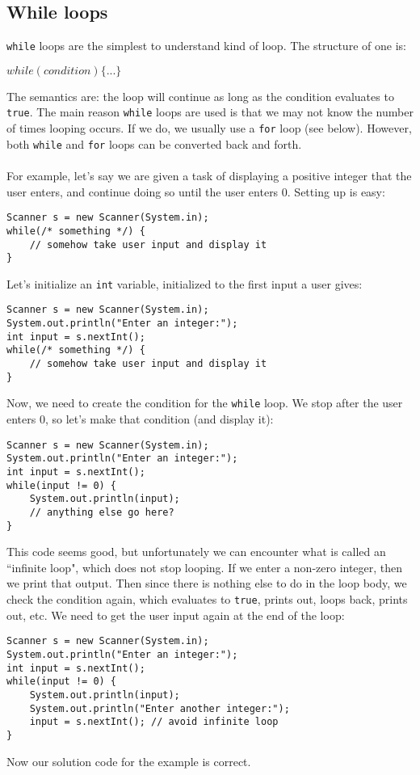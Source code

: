 \subsection{While loops}
\verb|while| loops are the simplest to understand kind of loop. The structure of one is:
\begin{center}
$while(condition) \{...\}$
\end{center}
The semantics are: the loop will continue as long as the condition evaluates to \verb|true|. The main reason \verb|while| loops are used is that we may not know the number of times looping occurs. If we do, we usually use a \verb|for| loop (see below). However, both \verb|while| and \verb|for| loops can be converted back and forth.
\\ \\
For example, let's say we are given a task of displaying a positive integer that the user enters, and continue doing so until the user enters 0. Setting up is easy:
\begin{lstlisting}
Scanner s = new Scanner(System.in);
while(/* something */) {
	// somehow take user input and display it
}
\end{lstlisting}
Let's initialize an \verb|int| variable, initialized to the first input a user gives:
\begin{lstlisting}
Scanner s = new Scanner(System.in);
System.out.println("Enter an integer:");
int input = s.nextInt();
while(/* something */) {
	// somehow take user input and display it
}
\end{lstlisting}
Now, we need to create the condition for the \verb|while| loop. We stop after the user enters 0, so let's make that condition (and display it):
\begin{lstlisting}
Scanner s = new Scanner(System.in);
System.out.println("Enter an integer:");
int input = s.nextInt();
while(input != 0) {
	System.out.println(input);
	// anything else go here?
}
\end{lstlisting}
This code seems good, but unfortunately we can encounter what is called an ``infinite loop", which does not stop looping. If we enter a non-zero integer, then we print that output. Then since there is nothing else to do in the loop body, we check the condition again, which evaluates to \verb|true|, prints out, loops back, prints out, etc. We need to get the user input again at the end of the loop:
\begin{lstlisting}
Scanner s = new Scanner(System.in);
System.out.println("Enter an integer:");
int input = s.nextInt();
while(input != 0) {
	System.out.println(input);
	System.out.println("Enter another integer:");
	input = s.nextInt(); // avoid infinite loop
}
\end{lstlisting}
Now our solution code for the example is correct.

